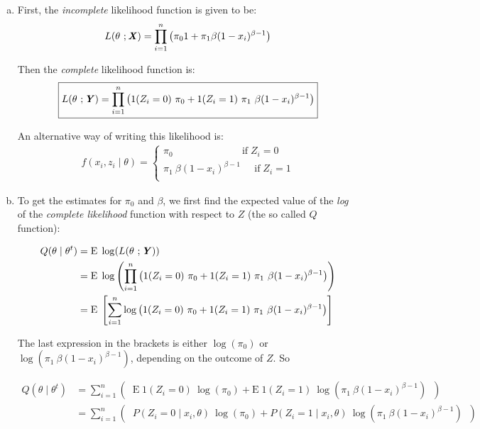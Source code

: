 \documentclass[12pt]{article}
\newcommand{\blditX}{\textbf{\textit{X}}}
\newcommand{\blditY}{\textbf{\textit{Y}}}
\begin{document}
  
\begin{enumerate}[(a)]  
\item First, the \emph{incomplete} likelihood function is given to be:
  $$
  L(\theta \ ; \blditX) = \prod_{i=1}^n \left(   \pi_0 1 + \pi_1 \beta (1 - x_i)^{\beta - 1}   \right)
  $$



Then the \emph{complete} likelihood function is:
$$\boxed{
L(\theta \ ; \blditY) = \prod_{i=1}^n \left( 1 (Z_i = 0) \ \pi_0  + 1( Z_i = 1) \ \pi_1 \ \beta (1 - x_i)^{\beta - 1} \right) }
$$ 
  
  An alternative way of writing this likelihood is:
  \begin{align*}
   f(x_i, z_i \mid \theta) = 
  \begin{cases}
  \pi_0 \; \; \; \; \; \; \; \; \; \; \; \; \; \; \; \; \; \; \; \; \; \; \; \; \; \text{if} \; Z_i = 0\\
  \pi_1 \ \beta (1 - x_i)^{\beta - 1}\; \; \; \; \; \text{if}  \; Z_i = 1\\
  \end{cases}
  \end{align*}
\item To get the estimates for $\pi_0$ and $\beta$, we first find the expected value of the \emph{log} of the \emph{complete likelihood} function with respect to $Z$ (the so called $Q$ function):

\begin{align*}
Q(\theta \mid \theta^t) &= \mathrm{E} \; \log (L(\theta \ ; \blditY) ) \\
&= \mathrm{E} \; \log \left( \prod_{i=1}^n \left( 1 (Z_i = 0)\ \pi_0   + 1( Z_i = 1)\ \pi_1  \ \beta (1 - x_i)^{\beta - 1} \right) \right)\\
&= \mathrm{E} \; \left[ \sum_{i=1}^n  \log \left( 1 (Z_i = 0)\ \pi_0   + 1( Z_i = 1)\ \pi_1 \ \beta (1 - x_i)^{\beta - 1} \right) \right] \\
\end{align*}
  
  The last expression in the brackets is either $\log(\pi_0)$ or $ \log(\pi_1\ \beta (1 - x_i)^{\beta - 1})$, depending on the outcome of $Z$. So
  
\begin{align*}
Q(\theta \mid \theta^t) &= \sum_{i=1}^n \left( \; \; \mathrm{E} \; 1 (Z_i = 0)\ \log(\pi_0) + \mathrm{E} \; 1 (Z_i = 1)\ \log(\pi_1\ \beta (1 - x_i)^{\beta - 1}) \; \; \right) \\
&= \sum_{i=1}^n \left( \; \; P(Z_i = 0 \mid x_i, \theta)\ \log(\pi_0) +  P(Z_i = 1 \mid x_i, \theta)\ \log(\pi_1\ \beta (1 - x_i)^{\beta - 1}) \; \; \right) \\
\end{align*}
  

\end{enumerate}
\end{document}
